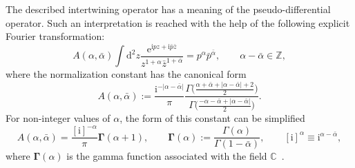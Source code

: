 \documentclass[10pt,a4paper]{amsart}
\renewcommand{\imath}{\mathrm{i}}
\numberwithin{equation}{section}
\begin{document}
The described intertwining operator has a meaning of the
pseudo-differential operator. Such an interpretation is reached
with the help of the following explicit Fourier transformation:
\begin{equation}\label{F}
A(\alpha,\bar\alpha) \int \mathrm{d}^2 z \frac{\mathrm{e}^{\imath pz+\imath\bar{p}\bar{z}}}
{z^{1+\alpha}\bar{z}^{1+\bar\alpha}} =
p^{\alpha}\bar{p}^{\bar\alpha} ,\qquad \alpha-\bar\alpha\in \mathbb{Z},
\end{equation}
where the normalization constant has the canonical form~\cite{GGV}
\begin{equation*}
A(\alpha,\bar\alpha):= \frac{\imath^{-|\alpha-\bar\alpha|}}{\pi}
 \frac{\Gamma\bigl(\frac{\alpha+\bar\alpha+|\alpha-\bar\alpha|+2}{2}\bigr)}
{\Gamma\bigl(\frac{-\alpha-\bar\alpha+|\alpha-\bar\alpha|}{2}\bigr)}.
\end{equation*}
For non-integer values of $\alpha$,
the form of this constant can be simplified
\begin{equation*}
A(\alpha,\bar\alpha) =
\frac{[\imath]^{-\alpha}}{\pi} \bm{\Gamma}(\alpha+1), \qquad
\bm{\Gamma}(\alpha):=\frac{\Gamma(\alpha)}{\Gamma(1-\bar\alpha)}, \qquad
[\imath]^{\alpha} \equiv \imath^{\alpha-\bar{\alpha}},
\end{equation*}
where $\bm{\Gamma}(\alpha)$ is the gamma function
associated with the field $\mathbb{C}$~\cite{GGR,N}.
\end{document}
